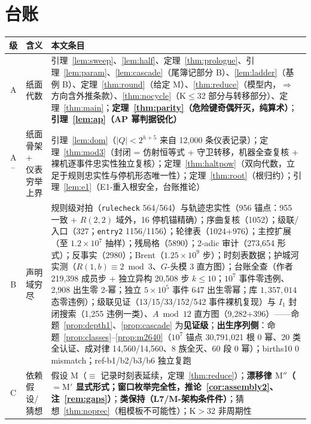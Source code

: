 \documentclass[11pt]{ctexart}
\theoremstyle{definition}
\begin{document}
\section{台账}

\begin{center}
\begin{tabular}{clp{8.2cm}}
\toprule
级 & 含义 & 本文条目\\
\midrule
A & 纸面代数 & 引理~\ref{lem:sweep}、\ref{lem:half}、定理~\ref{thm:prologue}、引理~\ref{lem:param}、\ref{lem:cascade}（尾簿记部分 B）、\ref{lem:ladder}（基例 B）、定理~\ref{thm:round}（给定 M）、\ref{thm:reduce}（模型内，$\Rightarrow$ 方向含外推条款）、\ref{thm:nocycle}（K$\le$32 部分与转移部分）、定理~\ref{thm:main}；\textbf{定理~\ref{thm:parity}（危险键奇偶歼灭，纯算术）}；\textbf{引理~\ref{lem:ap}（AP 幂判据锐化）}\\
A$^-$ & 纸面骨架 + 仪表穷举上界 & 引理~\ref{lem:dom}（$|Q|<2^{h+5}$ 来自 12,000 条仪表记录）；定理~\ref{thm:mod3}（封闭 = 仿射恒等式 + 守卫转移，机器全查复核 + 裸机逐事件忠实性独立复核）；定理~\ref{thm:haltpow}（双向代数，立足于规则忠实性与停机形态唯一性）；定理~\ref{thm:root}（根归约）；引理~\ref{lem:e1}（E1-重入根安全，台账推论）\\
B & 声明域穷尽 & 规则级对拍（\texttt{rulecheck} 564/564）与轨迹忠实性（956 锚点：955 一致 + $R(2,2)$ 域外，16 停机锚精确）；序曲复核（1052）；级联/入口（327；\texttt{entry2} 1156/1156）；轮律表（1024+976）；主控扩展（至 $1.2\times10^7$ 抽样）；残局格（5890）；2-adic 审计（273{,}654 形式）；反事实（2980）；Brent（$1.25\times10^9$ 步）；时刻表数据；护城河实测（$R(1,b)\equiv2\bmod3$、$G$-头模 3 直方图）；台账全查（作者 219,398 成员步 + 独立异构 20,508 步 $k\le10$；$10^7$ 事件零违例、2,908 出生零 2-幂；独立 $5\times10^5$ 事件 647 出生零幂；库 $1{,}357{,}014$ 态零违例）；级联见证（13/15/33/152/542 事件裸机复现）与 $I_1$ 封闭搜索（1,255 违例一类）、$A\bmod12$ 直方图（9,282+396）——命题~\ref{prop:depth1}、\ref{prop:cascade} 为\textbf{见证级}；\textbf{出生序列侧}：命题~\ref{prop:classes}–\ref{prop:m2640}（$10^7$ 锚点 30,791,021 根 0 幂、20 类全认证、成对律 14,560/14,560、8 族全灭、60 段 0 幂）；births10 0 mismatch；ref-b1/b2/b3/b6 独立复跑\\
C & 依赖假设/猜想 & 假设 M（$\equiv$ 记录时刻表延续，定理~\ref{thm:reduce}）；\textbf{漂移律 $\mathrm{M''}$（$=\mathrm{M'}$ 显式形式；窗口枚举完全性，推论~\ref{cor:assembly2}、注~\ref{rem:gaps}）}；\textbf{类保持（L7/M-架构条件件）}；猜想~\ref{thm:noprec}（粗模板不可能性）；K$>$32 非周期性\\
\bottomrule
\end{tabular}
\end{center}
\end{document}
